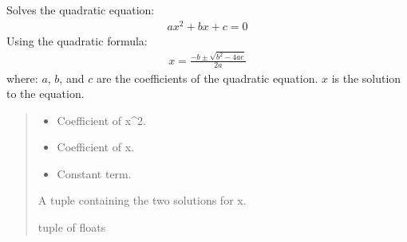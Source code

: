 \documentclass[a4paper,14pt,oneside,english,openany]{sphinxmanual}
\begin{document}
\begin{fulllineitems}
\label{\detokenize{newtest:newtest.quadratic_formula}}
\pysigstartsignatures
{}
\pysigstopsignatures
\sphinxAtStartPar
Solves the quadratic equation:
\begin{equation*}
\begin{split}ax^2 + bx + c = 0\end{split}
\end{equation*}
\sphinxAtStartPar
Using the quadratic formula:
\begin{equation*}
\begin{split}x = \frac{-b \pm \sqrt{b^2 - 4ac}}{2a}\end{split}
\end{equation*}
\sphinxAtStartPar
where:
\sphinxhyphen{} \(a\), \(b\), and \(c\) are the coefficients of the quadratic equation.
\sphinxhyphen{} \(x\) is the solution to the equation.
\begin{quote}\begin{description}
\begin{itemize}
\item {} 
\sphinxAtStartPar
{} \textendash{} Coefficient of x\textasciicircum{}2.

\item {} 
\sphinxAtStartPar
{} \textendash{} Coefficient of x.

\item {} 
\sphinxAtStartPar
{} \textendash{} Constant term.

\end{itemize}

\sphinxAtStartPar
A tuple containing the two solutions for x.

\sphinxAtStartPar
tuple of floats

\end{description}\end{quote}

\end{fulllineitems}

\end{document}
